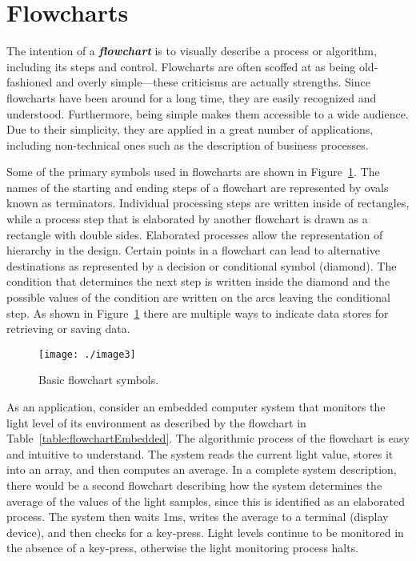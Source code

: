 \section{Flowcharts}
\label{section:flowcharts}

The intention of a \emph{\textbf{flowchart}} is to visually describe a
process or algorithm, including its steps and control. Flowcharts are
often scoffed at as being old-fashioned and overly simple---these
criticisms are actually strengths. Since flowcharts have been around for
a long time, they are easily recognized and understood. Furthermore,
being simple makes them accessible to a wide audience. Due to their
simplicity, they are applied in a great number of applications,
including non-technical ones such as the description of business
processes.

Some of the primary symbols used in flowcharts are shown in 
Figure~\ref{figure:basicFlowChartSymbols}.
The names of the starting and ending steps of a flowchart are
represented by ovals known as terminators. Individual processing steps
are written inside of rectangles, while a process step that is
elaborated by another flowchart is drawn as a rectangle with double
sides. Elaborated processes allow the representation of hierarchy in the
design. Certain points in a flowchart can lead to alternative
destinations as represented by a decision or conditional symbol
(diamond). The condition that determines the next step is written inside
the diamond and the possible values of the condition are written on the
arcs leaving the conditional step. As shown in 
Figure~\ref{figure:basicFlowChartSymbols} there are
multiple ways to indicate data stores for retrieving or saving data.

\begin{figure}[h]
\centering
\texttt{[image: ./image3]}
\caption{Basic flowchart symbols.}
\label{figure:basicFlowChartSymbols}
\end{figure}

As an application, consider an embedded computer system that monitors
the light level of its environment as described by the flowchart in
Table~\ref{table:flowchartEmbedded}. 
The algorithmic process of the flowchart is easy and
intuitive to understand. The system reads the current light value,
stores it into an array, and then computes an average. In a complete
system description, there would be a second flowchart describing how the
system determines the average of the values of the light samples, since
this is identified as an elaborated process. The system then waits 1ms,
writes the average to a terminal (display device), and then checks for a
key-press. Light levels continue to be monitored in the absence of a
key-press, otherwise the light monitoring process halts.


